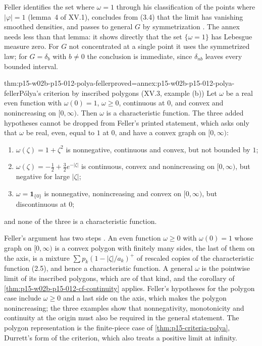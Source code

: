 Feller identifies the set where \(\omega=1\) through his classification of
the points where \(|\varphi|=1\) (lemma~4 of XV.1), concludes from (3.4) that
the limit has vanishing smoothed densities, and passes to general \(G\) by
symmetrization \cite[vol.~II, XV.3, p.~508]{Feller1971ProbabilityII}. The
annex needs less than that lemma: it shows directly that the set
\(\{\omega=1\}\) has Lebesgue measure zero. For \(G\) not concentrated at a
single point it uses the symmetrized law; for \(G=\delta_b\) with \(b\neq0\)
the conclusion is immediate, since \(\delta_{nb}\) leaves every bounded
interval.

\begin{hbtheorem}{thm:p15-w02b-p15-012-polya-feller}{proved=annex:p15-w02b-p15-012-polya-feller}{P\'olya's criterion by inscribed polygons (XV.3, example (b))}
Let \(\omega\) be a real even function with \(\omega(0)=1\), \(\omega\geq0\),
continuous at \(0\), and convex and nonincreasing on \([0,\infty)\). Then
\(\omega\) is a characteristic function. The three added hypotheses cannot be
dropped from Feller's printed statement, which asks only that \(\omega\) be
real, even, equal to \(1\) at \(0\), and have a convex graph on \([0,\infty)\):
\begin{enumerate}
\item \(\omega(\zeta)=1+\zeta^2\) is nonnegative, continuous and convex, but
      not bounded by \(1\);
\item \(\omega(\zeta)=-\tfrac12+\tfrac32e^{-|\zeta|}\) is continuous, convex
      and nonincreasing on \([0,\infty)\), but negative for large
      \(|\zeta|\);
\item \(\omega=\mathbf 1_{\{0\}}\) is nonnegative, nonincreasing and convex on
      \([0,\infty)\), but discontinuous at \(0\);
\end{enumerate}
and none of the three is a characteristic function.
\end{hbtheorem}

Feller's argument has two steps \cite[vol.~II, XV.2, example (b),
pp.~504--505; XV.3, example (b), p.~509]{Feller1971ProbabilityII}. An even
function \(\omega\geq0\) with \(\omega(0)=1\) whose graph on \([0,\infty)\) is a
convex polygon with finitely many sides, the last of them on the axis, is a
mixture \(\sum p_k(1-|\zeta|/a_k)^+\) of rescaled copies of the
characteristic function (2.5), and hence a characteristic function. A general \(\omega\) is the pointwise
limit of its inscribed polygons, which are of that kind, and the corollary
of \cref{thm:p15-w02b-p15-012-cf-continuity} applies. Feller's hypotheses
for the polygon case include \(\omega\geq0\) and a last side on the axis,
which makes the polygon nonincreasing; the three examples show that
nonnegativity, monotonicity and continuity at the origin must also be required
in the general statement. The polygon representation is the finite-piece case of
\cref{thm:p15-criteria-polya}, Durrett's form of the criterion, which also
treats a positive limit at infinity.

